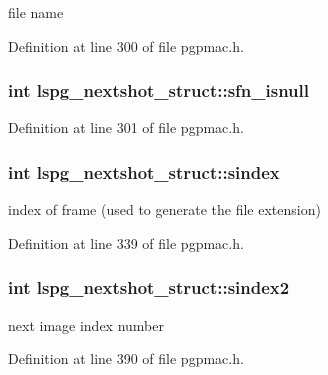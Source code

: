 file name 



Definition at line 300 of file pgpmac.\-h.

\hypertarget{structlspg__nextshot__struct_a56f32eb413b1fca9f085874eb86294de}{
\subsubsection[{sfn\-\_\-isnull}]{\setlength{\rightskip}{0pt plus 5cm}int lspg\-\_\-nextshot\-\_\-struct\-::sfn\-\_\-isnull}}\label{structlspg__nextshot__struct_a56f32eb413b1fca9f085874eb86294de}


Definition at line 301 of file pgpmac.\-h.

\hypertarget{structlspg__nextshot__struct_a5d096f2c2bf9be29c44129b54eaf01da}{
\subsubsection[{sindex}]{\setlength{\rightskip}{0pt plus 5cm}int lspg\-\_\-nextshot\-\_\-struct\-::sindex}}\label{structlspg__nextshot__struct_a5d096f2c2bf9be29c44129b54eaf01da}


index of frame (used to generate the file extension) 



Definition at line 339 of file pgpmac.\-h.

\hypertarget{structlspg__nextshot__struct_ae9d0cfdff6868e0ba9cd5acafbe133db}{
\subsubsection[{sindex2}]{\setlength{\rightskip}{0pt plus 5cm}int lspg\-\_\-nextshot\-\_\-struct\-::sindex2}}\label{structlspg__nextshot__struct_ae9d0cfdff6868e0ba9cd5acafbe133db}


next image index number 



Definition at line 390 of file pgpmac.\-h.

